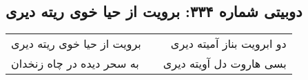 \begin{center}
\section*{دوبیتی شماره ۳۳۴: برویت از حیا خوی ریته دیری}
\label{sec:334}
\begin{longtable}{l p{0.5cm} r}
برویت از حیا خوی ریته دیری
&&
دو ابرویت بناز آمیته دیری
\\
به سحر دیده در چاه زنخدان
&&
بسی هاروت دل آویته دیری
\\
\end{longtable}
\end{center}
